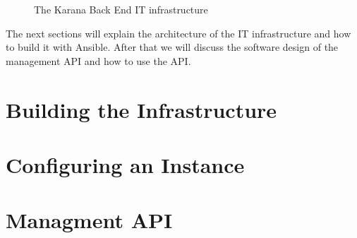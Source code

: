 \documentclass[draft=false,
10pt, %
a4paper, %
oneside, %
headinclude,footinclude, %
]{scrartcl}
\begin{document}
\begin{figure}
\begin{tikzpicture}
	\end{tikzpicture}
	\caption[KBE IT infrastructure]{The Karana Back End IT infrastructure} %
	\label{figure:infrastructrue}
\end{figure}

The next sections will explain  the architecture of the IT infrastructure and how to build it with Ansible. After that we will discuss the software design of the management API and how to use the API. 
 

\section{Building the Infrastructure}



\section{Configuring an Instance}\label{section:instance}




\section{Managment API}



\renewcommand{\refname}{\spacedlowsmallcaps{References}} %




\end{document}
